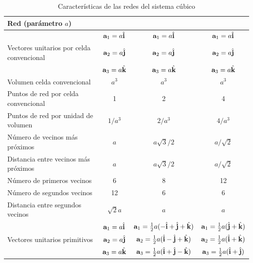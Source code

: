 \begin{table}[h!] \centering
	\begin{tabular}{lccc}
		Red (parámetro $a$) & \sc & \bcc & \fcc \\ \hline 
		& $\mathbf{a}_1=a\hat{\mathbf{i}}$ &  $\mathbf{a}_1=a\hat{\mathbf{i}}$ & $\mathbf{a}_1=a\hat{\mathbf{i}}$  \\		
		Vectores unitarios por celda convencional  & $\mathbf{a}_2=a\hat{\mathbf{j}}$  & $\mathbf{a}_2=a\hat{\mathbf{j}}$  &  $\mathbf{a}_2=a\hat{\mathbf{j}}$ \\
		& $\mathbf{a}_3=a\hat{\mathbf{k}}$ & $\mathbf{a}_3=a\hat{\mathbf{k}}$  & $\mathbf{a}_3=a\hat{\mathbf{k}}$ \\ \hline
		Volumen celda convencional & $a^3$ & $a^3$ & $a^3$ \\ \hline
		Puntos de red por celda convencional & 1 & 2 & 4 \\ \hline
		Puntos de red por unidad de volumen & $1/a^3$ &  $2/a^3$ &  $4/a^3$ \\ \hline
		Número de vecinos más próximos & $a$ & $a\sqrt{3}/2$ & $a/\sqrt{2}$ \\ \hline
		Distancia entre vecinos más próximos & $a$ & $a\sqrt{3}/2$ & $a/\sqrt{2}$ \\ \hline
		Número de primeros vecinos & 6 & 8 & 12 \\ \hline
		Número de segundos vecinos & 12 & 6 & 6 \\ \hline
		Distancia entre segundos vecinos & $\sqrt{2} a$ & $a$ & $a$ \\ \hline
		& $\mathbf{a}_1=a\hat{\mathbf{i}}$ &  $\mathbf{a}_1=\frac{1}{2} a (-\hat{\mathbf{i}}+\hat{\mathbf{j}}+\hat{\mathbf{k}})$ &   $\mathbf{a}_1=\frac{1}{2} a (\hat{\mathbf{j}}+\hat{\mathbf{k}})$  \\
		Vectores unitarios primitivos &$\mathbf{a}_2=a\hat{\mathbf{j}}$ &  $\mathbf{a}_2=\frac{1}{2} a (\hat{\mathbf{i}}-\hat{\mathbf{j}}+\hat{\mathbf{k}})$ &   $\mathbf{a}_2=\frac{1}{2} a (\hat{\mathbf{i}}+\hat{\mathbf{k}})$  \\
		&$\mathbf{a}_3=a\hat{\mathbf{k}}$ &  $\mathbf{a}_3=\frac{1}{2} a (\hat{\mathbf{i}}+\hat{\mathbf{j}}-\hat{\mathbf{k}})$ &   $\mathbf{a}_3=\frac{1}{2} a (\hat{\mathbf{i}}+\hat{\mathbf{j}})$  \\ \hline		
	\end{tabular}
	\caption{Características de las redes del sistema cúbico}
	\label{Tab:01-03}
\end{table} 

